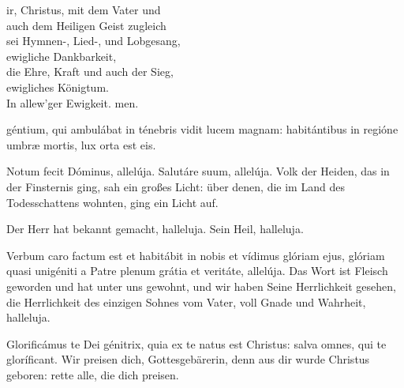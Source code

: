 \documentclass[fontsize=10pt,paper=A5,twoside,BCOR=1mm,DIV=21,headinclude]{scrarticle}
\begin{document}
\begin{paracol}{2}
\begin{hymnus}
ir, Christus, mit dem Vater und\\
auch dem Heiligen Geist zugleich\\
sei Hymnen-, Lied-, und Lobgesang,\\
ewigliche Dankbarkeit,\\
die Ehre, Kraft und auch der Sieg,\\
ewigliches Königtum.\\
In allew'ger Ewigkeit.
men.
\end{hymnus}
\end{paracol}


\vspace{.3em}

\begin{paracol}{2}\pcb
{} géntium, qui ambulábat in ténebris vidit lucem magnam: habitántibus in regióne umbræ mortis, lux orta est eis.

\V Notum fecit Dóminus, allelúja.
\R Salutáre suum, allelúja.
	\switchcolumn
	 Volk der Heiden, das in der Finsternis ging, sah ein großes Licht: über denen, die im Land des Todesschattens wohnten, ging ein Licht auf.

	\V Der Herr hat bekannt gemacht, halleluja.
	\R Sein Heil, halleluja.
\end{paracol}


\vspace{.3em}

\begin{paracol}{2}\pcb
\A Verbum caro factum est et habitábit in nobis et vídimus glóriam ejus, glóriam quasi unigéniti a Patre plenum grátia et veritáte, allelúja.
	\switchcolumn
	\A Das Wort ist Fleisch geworden und hat unter uns gewohnt, und wir haben Seine Herrlichkeit gesehen, die Herrlichkeit des einzigen Sohnes vom Vater, voll Gnade und Wahrheit, halleluja.
\end{paracol}


\vspace{.3em}

\begin{paracol}{2}\pcb
\A Glorificámus te Dei génitrix, quia ex te natus est Christus: salva omnes, qui te gloríficant.
	\switchcolumn
	\A Wir preisen dich, Gottesgebärerin, denn aus dir wurde Christus geboren: rette alle, die dich preisen.
\end{paracol}
\end{document}
